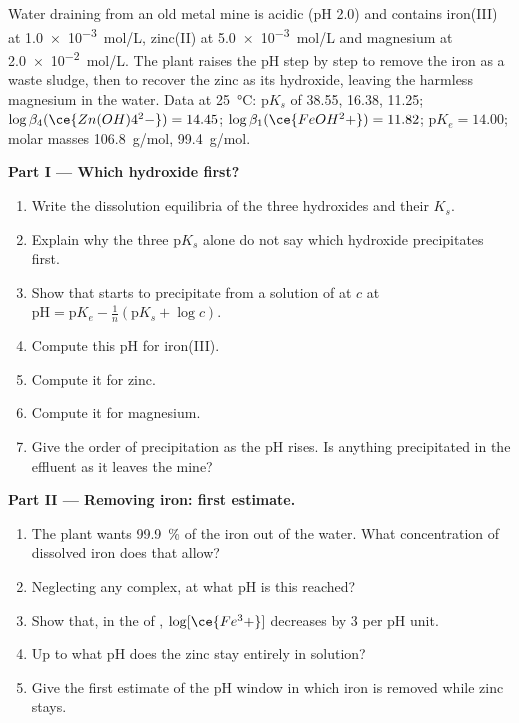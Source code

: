 \begin{problem}
\label{pb:b1:precipitation:1}
Water draining from an old metal mine is acidic (pH 2.0) and contains
iron(III) at \qty{1.0e-3}{mol/L}, zinc(II) at \qty{5.0e-3}{mol/L} and
magnesium at \qty{2.0e-2}{mol/L}. The plant raises the pH step by step to
remove the iron as a waste sludge, then to recover the zinc as its
hydroxide, leaving the harmless magnesium in the water. Data at
\qty{25}{\celsius}: $\mathrm{p}K_s$ of  38.55, 
16.38,  11.25; $\log\beta_4(\ce{Zn(OH)4^2-}) = 14.45$;
$\log\beta_1(\ce{FeOH^2+}) = 11.82$; $\mathrm{p}K_e = 14.00$; molar masses
 \qty{106.8}{g/mol},  \qty{99.4}{g/mol}.

\medskip
\noindent\textbf{Part I --- Which hydroxide first?}
\begin{enumerate}
  \item Write the dissolution equilibria of the three hydroxides and
        their $K_s$.
  \item Explain why the three $\mathrm{p}K_s$ alone do not say which
        hydroxide precipitates first.
  \item Show that  starts to precipitate from a solution of
         at $c$ at $\mathrm{pH} = \mathrm{p}K_e -
        \frac1n(\mathrm{p}K_s + \log c)$.
  \item Compute this pH for iron(III).
  \item Compute it for zinc.
  \item Compute it for magnesium.
  \item Give the order of precipitation as the pH rises. Is anything
        precipitated in the effluent as it leaves the mine?
\end{enumerate}

\medskip
\noindent\textbf{Part II --- Removing iron: first estimate.}
\begin{enumerate}[resume]
  \item The plant wants \qty{99.9}{\percent} of the iron out of the water. What
        concentration of dissolved iron does that allow?
  \item Neglecting any complex, at what pH is this reached?
  \item Show that, in the  of ,
        $\log[\ce{Fe^3+}]$ decreases by 3 per pH unit.
  \item Up to what pH does the zinc stay entirely in solution?
  \item Give the first estimate of the pH window in which iron is removed
        while zinc stays.
\end{enumerate}


\end{problem}
